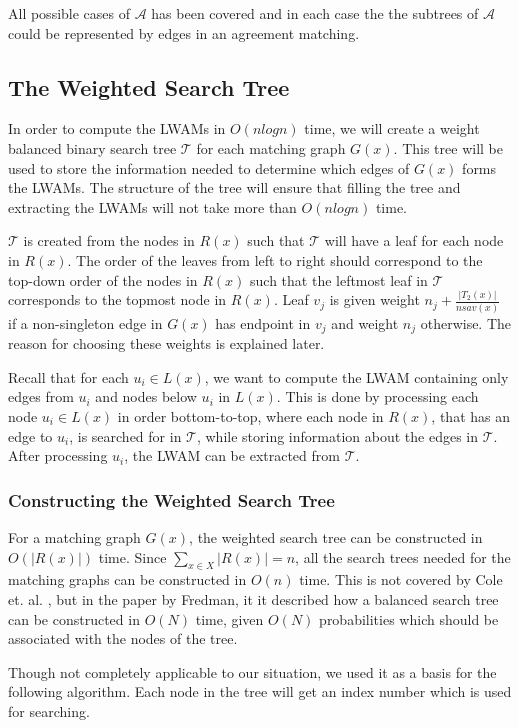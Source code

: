All possible cases of $\mathcal{A}$ has been covered and in each case the the subtrees of $\mathcal{A}$ could be represented by edges in an agreement matching.

\subsection{The Weighted Search Tree}
In order to compute the LWAMs in $O(nlogn)$ time, we will create a weight balanced binary search tree $\mathcal{T}$ for each matching graph $G(x)$. This tree will be used to store the information needed to determine which edges of $G(x)$ forms the LWAMs. The structure of the tree will ensure that filling the tree and extracting the LWAMs will not take more than $O(nlogn)$ time.

$\mathcal{T}$ is created from the nodes in $R(x)$ such that $\mathcal{T}$ will have a leaf for each node in $R(x)$. The order of the leaves from left to right should correspond to the top-down order of the nodes in $R(x)$ such that the leftmost leaf in $\mathcal{T}$ corresponds to the topmost node in $R(x)$. Leaf $v_j$ is given weight $n_j + \frac{|T_2(x)|}{nsav(x)}$ if a non-singleton edge in $G(x)$ has endpoint in $v_j$ and weight $n_j$ otherwise. The reason for choosing these weights is explained later.

Recall that for each $u_i \in L(x)$, we want to compute the LWAM containing only edges from $u_i$ and nodes below $u_i$ in $L(x)$. This is done by processing each node $u_i \in L(x)$ in order bottom-to-top, where each node in $R(x)$, that has an edge to $u_i$, is searched for in $\mathcal{T}$, while storing information about the edges in $\mathcal{T}$.  After processing $u_i$, the LWAM can be extracted from $\mathcal{T}$. 

\subsubsection{Constructing the Weighted Search Tree}
For a matching graph $G(x)$, the weighted search tree can be constructed in $O(|R(x)|)$ time. Since $\sum_{x \in X} |R(x)| = n$, all the search trees needed for the matching graphs can be constructed in $O(n)$ time. This is not covered by Cole et. al. \cite{nlogn}, but in the paper \cite{fredman} by Fredman, it it described how a balanced search tree can be constructed in $O(N)$ time, given $O(N)$ probabilities which should be associated with the nodes of the tree.

Though not completely applicable to our situation, we used it as a basis for the following algorithm. Each node in the tree will get an index number which is used for searching.

